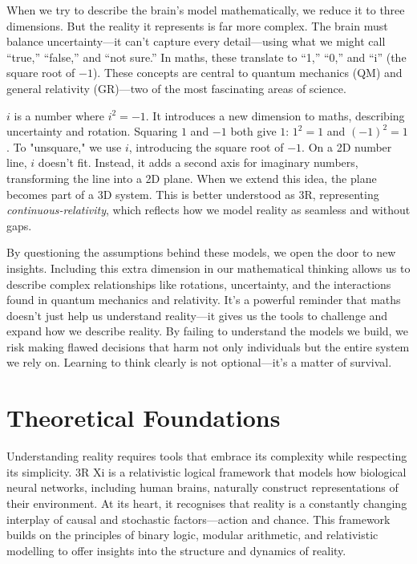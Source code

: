 \documentclass[12pt]{article}
\begin{document}
When we try to describe the brain’s model mathematically, we reduce it to three dimensions. But the reality it represents is far more complex. The brain must balance uncertainty—it can’t capture every detail—using what we might call ``true,'' ``false,'' and ``not sure.'' In maths, these translate to ``1,'' ``0,'' and ``i'' (the square root of $-1$). These concepts are central to quantum mechanics (QM) and general relativity (GR)—two of the most fascinating areas of science.

$i$ is a number where $i^2 = -1$. It introduces a new dimension to maths, describing uncertainty and rotation. Squaring $1$ and $-1$ both give $1$: $1^2 = 1$ and $(-1)^2 = 1$. To "unsquare," we use $i$, introducing the square root of $-1$. On a 2D number line, $i$ doesn’t fit. Instead, it adds a second axis for imaginary numbers, transforming the line into a 2D plane. When we extend this idea, the plane becomes part of a 3D system. This is better understood as 3R, representing \emph{continuous-relativity}, which reflects how we model reality as seamless and without gaps.

By questioning the assumptions behind these models, we open the door to new insights. Including this extra dimension in our mathematical thinking allows us to describe complex relationships like rotations, uncertainty, and the interactions found in quantum mechanics and relativity. It’s a powerful reminder that maths doesn’t just help us understand reality—it gives us the tools to challenge and expand how we describe reality. By failing to understand the models we build, we risk making flawed decisions that harm not only individuals but the entire system we rely on. Learning to think clearly is not optional—it’s a matter of survival.

\section*{Theoretical Foundations}

Understanding reality requires tools that embrace its complexity while respecting its simplicity. 3R Xi is a relativistic logical framework that models how biological neural networks, including human brains, naturally construct representations of their environment. At its heart, it recognises that reality is a constantly changing interplay of causal and stochastic factors—action and chance. This framework builds on the principles of binary logic, modular arithmetic, and relativistic modelling to offer insights into the structure and dynamics of reality.
\end{document}
